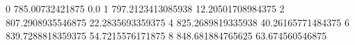 0 785.00732421875 0.0
1 797.2123413085938 12.20501708984375
2 807.2908935546875 22.2835693359375
4 825.2689819335938 40.26165771484375
6 839.7288818359375 54.7215576171875
8 848.681884765625 63.674560546875
